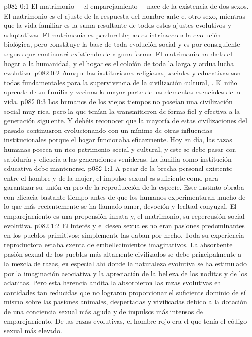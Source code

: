 \author{Jefe de los serafines}
\vs p082 0:1 El matrimonio ---el emparejamiento--- nace de la existencia de dos sexos. El matrimonio es el ajuste de la respuesta del hombre ante el otro sexo, mientras que la vida familiar es la suma resultante de todos estos ajustes evolutivos y adaptativos. El matrimonio es perdurable; no es intrínseco a la evolución biológica, pero constituye la base de toda evolución social y es por consiguiente seguro que continuará existiendo de alguna forma. El matrimonio ha dado el hogar a la humanidad, y el hogar es el colofón de toda la larga y ardua lucha evolutiva.
\vs p082 0:2 Aunque las instituciones religiosas, sociales y educativas son todas fundamentales para la supervivencia de la civilización cultural, . El niño aprende de su familia y vecinos la mayor parte de los elementos esenciales de la vida.
\vs p082 0:3 Los humanos de los viejos tiempos no poseían una civilización social muy rica, pero la que tenían la transmitieron de forma fiel y efectiva a la generación siguiente. Y debéis reconocer que la mayoría de estas civilizaciones del pasado continuaron evolucionando con un mínimo de otras influencias institucionales porque el hogar funcionaba eficazmente. Hoy en día, las razas humanas poseen un rico patrimonio social y cultural, y este se debe pasar con sabiduría y eficacia a las generaciones venideras. La familia como institución educativa debe mantenerse.
\vs p082 1:1 A pesar de la brecha personal existente entre el hombre y de la mujer, el impulso sexual es suficiente como para garantizar su unión en pro de la reproducción de la especie. Este instinto obraba con eficacia bastante tiempo antes de que los humanos experimentaran mucho de lo que más recientemente se ha llamado amor, devoción y lealtad conyugal. El emparejamiento es una propensión innata y, el matrimonio, su repercusión social evolutiva.
\vs p082 1:2 El interés y el deseo sexuales no eran pasiones predominantes en los pueblos primitivos; simplemente las daban por hecho. Toda su experiencia reproductora estaba exenta de embellecimientos imaginativos. La absorbente pasión sexual de los pueblos más altamente civilizados se debe principalmente a la mezcla de razas, en especial ahí donde la naturaleza evolutiva se ha estimulado por la imaginación asociativa y la apreciación de la belleza de los noditas y de los adanitas. Pero esta herencia andita la absorbieron las razas evolutivas en cantidades tan reducidas que no lograron proporcionar el suficiente dominio de sí mismo sobre las pasiones animales, despertadas y vivificadas debido a la dotación de una conciencia sexual más aguda y de impulsos más intensos de emparejamiento. De las razas evolutivas, el hombre rojo era el que tenía el código sexual más elevado.
